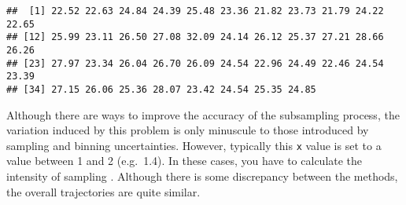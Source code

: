 \documentclass[]{article}
\begin{document}
\begin{verbatim}
##  [1] 22.52 22.63 24.84 24.39 25.48 23.36 21.82 23.73 21.79 24.22 22.65
## [12] 25.99 23.11 26.50 27.08 32.09 24.14 26.12 25.37 27.21 28.66 26.26
## [23] 27.97 23.34 26.04 26.70 26.09 24.54 22.96 24.49 22.46 24.54 23.39
## [34] 27.15 26.06 25.36 28.07 23.42 24.54 25.35 24.85
\end{verbatim}

Although there are ways to improve the accuracy of the subsampling
process, the variation induced by this problem is only minuscule to
those introduced by sampling and binning uncertainties. However,
typically this \texttt{x} value is set to a value between 1 and 2
(e.g.~1.4). In these cases, you have to calculate the intensity of
sampling . Although there is some discrepancy between the methods, the
overall trajectories are quite similar.
\end{document}
